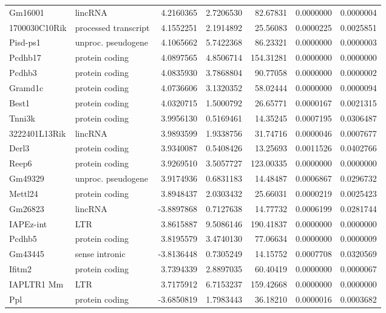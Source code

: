 \documentclass[onehalf,12pt]{beavtex}
\begin{document}
\begin{longtable}{llrrrrr}
  \addlinespace
  Gm16001 & lincRNA & 4.2160365 & 2.7206530 & 82.67831 & 0.0000000 & 0.0000004\\
  1700030C10Rik & processed transcript & 4.1552251 & 2.1914892 & 25.56083 & 0.0000225 & 0.0025851\\
  Pisd-ps1 & unproc. pseudogene & 4.1065662 & 5.7422368 & 86.23321 & 0.0000000 & 0.0000003\\
  Pcdhb17 & protein coding & 4.0897565 & 4.8506714 & 154.31281 & 0.0000000 & 0.0000000\\
  Pcdhb3 & protein coding & 4.0835930 & 3.7868804 & 90.77058 & 0.0000000 & 0.0000002\\
  \addlinespace
  Gramd1c & protein coding & 4.0736606 & 3.1320352 & 58.02444 & 0.0000000 & 0.0000094\\
  Best1 & protein coding & 4.0320715 & 1.5000792 & 26.65771 & 0.0000167 & 0.0021315\\
  Tnni3k & protein coding & 3.9956130 & 0.5169461 & 14.35245 & 0.0007195 & 0.0306487\\
  3222401L13Rik & lincRNA & 3.9893599 & 1.9338756 & 31.74716 & 0.0000046 & 0.0007677\\
  Derl3 & protein coding & 3.9340087 & 0.5408426 & 13.25693 & 0.0011526 & 0.0402766\\
  \addlinespace
  Reep6 & protein coding & 3.9269510 & 3.5057727 & 123.00335 & 0.0000000 & 0.0000000\\
  Gm49329 & unproc. pseudogene & 3.9174936 & 0.6831183 & 14.48487 & 0.0006867 & 0.0296732\\
  Mettl24 & protein coding & 3.8948437 & 2.0303432 & 25.66031 & 0.0000219 & 0.0025423\\
  Gm26823 & lincRNA & -3.8897868 & 0.7127638 & 14.77732 & 0.0006199 & 0.0281744\\
  IAPEz-int & LTR & 3.8615887 & 9.5086146 & 190.41837 & 0.0000000 & 0.0000000\\
  \addlinespace
  Pcdhb5 & protein coding & 3.8195579 & 3.4740130 & 77.06634 & 0.0000000 & 0.0000009\\
  Gm43445 & sense intronic & -3.8136448 & 0.7305249 & 14.15752 & 0.0007708 & 0.0320569\\
  Ifitm2 & protein coding & 3.7394339 & 2.8897035 & 60.40419 & 0.0000000 & 0.0000067\\
  IAPLTR1 Mm & LTR & 3.7175912 & 6.7153237 & 159.42668 & 0.0000000 & 0.0000000\\
  Ppl & protein coding & -3.6850819 & 1.7983443 & 36.18210 & 0.0000016 & 0.0003682\\

\end{longtable}
\end{document}
